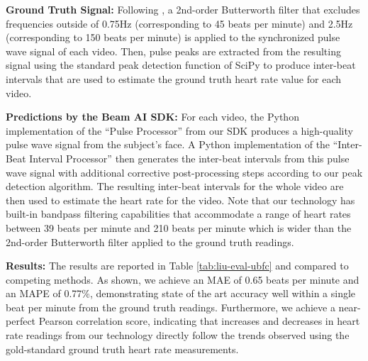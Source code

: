 \documentclass{article}
\begin{document}
\textbf{Ground Truth Signal:} Following \cite{EfficientPhys_Liu2021}, a 2nd-order Butterworth \cite{Selesnick96_Butterworth} filter that excludes frequencies outside of 0.75Hz (corresponding to 45 beats per minute) and 2.5Hz (corresponding to 150 beats per minute) is applied to the synchronized pulse wave signal of each video. Then, pulse peaks are extracted from the resulting signal using the standard peak detection function of SciPy \cite{2020SciPy-NMeth} to produce inter-beat intervals that are used to estimate the ground truth heart rate value for each video.

\textbf{Predictions by the Beam AI SDK:} For each video, the Python implementation of the ``Pulse Processor'' from our SDK produces a high-quality pulse wave signal from the subject's face. A Python implementation of the ``Inter-Beat Interval Processor'' then generates the inter-beat intervals from this pulse wave signal with additional corrective post-processing steps according to our peak detection algorithm. The resulting inter-beat intervals for the whole video are then used to estimate the heart rate for the video. Note that our technology has built-in bandpass filtering capabilities that accommodate a range of heart rates between 39 beats per minute and 210 beats per minute which is wider than the 2nd-order Butterworth \cite{Selesnick96_Butterworth} filter applied to the ground truth readings.

\textbf{Results:} The results are reported in Table \ref{tab:liu-eval-ubfc} and compared to competing methods. As shown, we achieve an MAE of 0.65 beats per minute and an MAPE of 0.77\%, demonstrating state of the art accuracy well within a single beat per minute from the ground truth readings. Furthermore, we achieve a near-perfect Pearson correlation score, indicating that increases and decreases in heart rate readings from our technology directly follow the trends observed using the gold-standard ground truth heart rate measurements.
\end{document}
